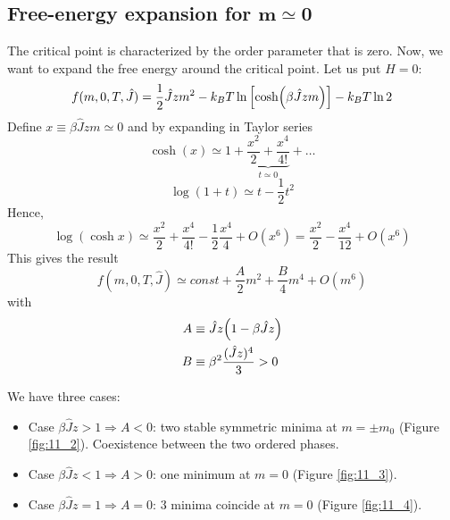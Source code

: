 \documentclass[../../Main/Main.tex]{subfiles}
\begin{document}
\subsection{Free-energy expansion for \( \pmb{m \simeq 0} \) }
The critical point is characterized by the order parameter that is zero. Now, we want to expand the free energy around the critical point. Let us put \( H=0 \):
\begin{equation}
  f(m,0,T,\hat{J} ) = \frac{1}{2}\hat{J}zm^2 -k_BT \ln{\qty[\cosh(\beta \hat{J}zm )]} - k_BT \ln{2}
\end{equation}
Define \( x \equiv \beta \hat{J} z m \simeq 0  \) and by expanding in Taylor series
\begin{equation*}
  \cosh (x) \simeq 1 + \underbrace{\frac{x^2}{2} + \frac{x^4}{4!}}_{t \simeq 0}  + \dots
\end{equation*}
\begin{equation*}
  \log{(1+t)} \simeq t - \frac{1}{2}t^2
\end{equation*}
Hence,
\begin{equation*}
  \log{(\cosh x)} \simeq \frac{x^2}{2} + \frac{x^4}{4!} - \frac{1}{2} \frac{x^4}{4}+O(x^6)
  = \frac{x^2}{2} - \frac{x^4}{12}+O(x^6)
\end{equation*}
This gives the result
\begin{equation}
  f(m,0,T,\hat{J} ) \simeq  const + \frac{A}{2} m^2 + \frac{B}{4} m^4 + O (m^6)
\end{equation}
with
\begin{subequations}
\begin{align}
   A & \equiv  \hat{J} z \qty(1- \beta \hat{J} z) \\
    B & \equiv  \beta ^2 \frac{(\hat{J}z )^4}{3} > 0
\end{align}
\end{subequations}

We have three cases:

\begin{itemize}
\item Case \( \beta \hat{J} z > 1 \Rightarrow A<0 \): two stable symmetric minima at \( m= \pm m_0 \) (Figure \ref{fig:11_2}). Coexistence between the two ordered phases.
\item Case \( \beta \hat{J} z < 1 \Rightarrow A>0 \): one minimum at \( m=0 \) (Figure \ref{fig:11_3}).
\item Case \( \beta \hat{J} z = 1 \Rightarrow A=0 \): 3 minima coincide at \( m=0 \) (Figure \ref{fig:11_4}).
\end{itemize}
\end{document}
